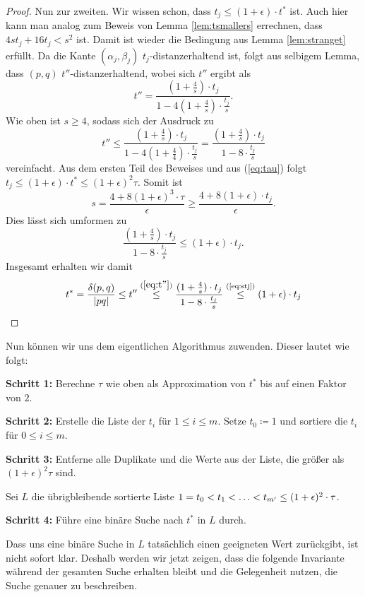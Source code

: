 \begin{proof}
	Nun zur zweiten. 
	Wir wissen schon, dass $t_j \leq (1 + \epsilon) \cdot t^*$ ist.
	Auch hier kann man analog zum Beweis von Lemma \ref{lem:tsmallers} errechnen, dass $4st_j + 16t_j < s^2$ ist. Damit ist wieder die Bedingung aus Lemma \ref{lem:stranget} erfüllt. Da die Kante $(\alpha_j, \beta_j)$ $t_j$-distanzerhaltend ist, folgt aus selbigem Lemma, dass $(p, q)$ $t''$-distanzerhaltend, wobei sich $t''$ ergibt als
	\[
	t'' = \frac{(1 + \frac{4}{s})\cdot t_j}{1 - 4 (1 + \frac{4}{s}) \cdot \frac{t_j}{s}}.
	\]
	Wie oben ist $s \geq 4$, sodass sich der Ausdruck zu 
	\[
	\label{eq:t''}
	t'' \leq \frac{(1 + \frac{4}{s})\cdot t_j}{1 - 4 (1 + \frac{4}{4}) \cdot \frac{t_j}{s}}
	= \frac{(1 + \frac{4}{s})\cdot t_j}{1 - 8 \cdot \frac{t_j}{s}} \tag{3}
	\]
	vereinfacht.
	Aus dem ersten Teil des Beweises und aus (\ref{eq:tau}) folgt $t_j \leq (1 + \epsilon) \cdot t^* \leq (1 + \epsilon)^2 \tau$. Somit ist
	\[
	s = \frac{4 + 8(1 + \epsilon)^3 \cdot \tau}{\epsilon} 
	\geq \frac{4 + 8 (1 + \epsilon) \cdot t_j}{\epsilon}. 
	\]
	Dies lässt sich umformen zu  
	\[
	\label{eq:stj}
	\frac{(1 + \frac{4}{s})\cdot t_j}{1 - 8 \cdot \frac{t_j}{s}} \leq (1 + \epsilon) \cdot t_j. \tag{4}
	\]
	Insgesamt erhalten wir damit \[
		t^* = \frac{\delta(p, q)}{|pq|} 
		\leq t''
		\stackrel{(\ref{eq:t''})}{\leq} \frac{(1 + \frac{4}{s})\cdot t_j}{1 - 8 \cdot \frac{t_j}{s}}
		\stackrel{\text{(\ref{eq:stj})}}{\leq} (1 + \epsilon)\cdot t_j
	\]
\end{proof}

Nun können wir uns dem eigentlichen Algorithmus zuwenden. Dieser lautet wie folgt:

\begin{description}
	\item{\textbf{Schritt 1:}} Berechne $\tau$ wie oben als Approximation von $t^*$ bis auf einen Faktor von $2$.
	\item{\textbf{Schritt 2:}} Erstelle die Liste der $t_i$ für $1 \leq i \leq m$. Setze $t_0 \coloneqq 1$ und sortiere die $t_i$ für $0 \leq i \leq m$.
	\item{\textbf{Schritt 3:}} Entferne alle Duplikate und die Werte aus der Liste, die größer als $(1 + \epsilon)^2 \tau$ sind.
	
	Sei $L$ die übrigbleibende sortierte Liste $1 = t_0 < t_1 < \mathellipsis < t_{m'} \leq (1 + \epsilon)^2\cdot \tau$.
	\item{\textbf{Schritt 4:}} Führe eine binäre Suche nach $t^*$ in $L$ durch.
\end{description}

Dass uns eine binäre Suche in $L$ tatsächlich einen geeigneten Wert zurückgibt, ist nicht sofort klar. Deshalb werden wir jetzt zeigen, dass die folgende Invariante während der gesamten Suche erhalten bleibt und die Gelegenheit nutzen, die Suche genauer zu beschreiben.

